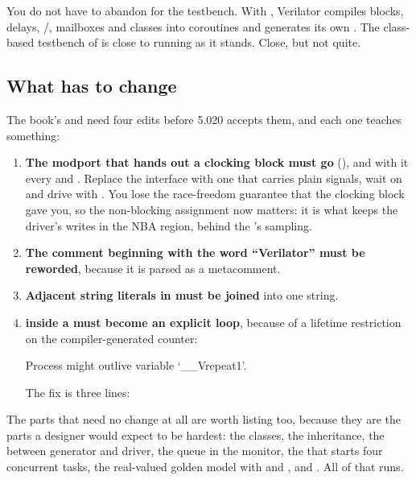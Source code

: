 You do not have to abandon \SV{} for the testbench. With , Verilator compiles  blocks, \code{\#} delays,
/, mailboxes and classes into coroutines and generates
its own . The class-based testbench of  is close to
running as it stands. Close, but not quite.

\subsection{What has to change}

The book's  and  need four edits
before 5.020 accepts them, and each one teaches something:

\begin{enumerate}
  \item \textbf{The modport that hands out a clocking block must go}
        (), and with it every
         and . Replace the
        interface with one that carries plain signals, wait on
         and drive with \code{<=}. You lose the
        race-freedom guarantee that the clocking block gave you, so the
        non-blocking assignment now matters: it is what keeps the driver's
        writes in the NBA region, behind the \DUT{}'s sampling.
  \item \textbf{The comment beginning with the word ``Verilator'' must be
        reworded}, because it is parsed as a metacomment.
  \item \textbf{Adjacent string literals in  must be joined}
        into one string.
  \item \textbf{ inside a
         must become an explicit loop}, because
        of a lifetime restriction on the compiler-generated counter:
\begin{txtcode}
        Process might outlive variable `__Vrepeat1'.
\end{txtcode}
        The fix is three lines:
\end{enumerate}

The parts that need no change at all are worth listing too, because they are
the parts a \VHDL{} designer would expect to be hardest: the classes, the
inheritance, the  between generator and driver,
the queue in the monitor, the  that starts four
concurrent tasks, the real-valued golden model with  and
, and . All of that runs.

